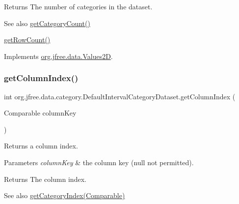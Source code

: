 \begin{DoxyReturn}{Returns}
The number of categories in the dataset.
\end{DoxyReturn}
\begin{DoxySeeAlso}{See also}
\mbox{\hyperlink{classorg_1_1jfree_1_1data_1_1category_1_1_default_interval_category_dataset_af1e71ac84aa326b3b7ef89c398e5c0fb}{get\+Category\+Count()}} 

\mbox{\hyperlink{classorg_1_1jfree_1_1data_1_1category_1_1_default_interval_category_dataset_af827538c915c040aac83c23bc980b0f5}{get\+Row\+Count()}} 
\end{DoxySeeAlso}


Implements \mbox{\hyperlink{interfaceorg_1_1jfree_1_1data_1_1_values2_d_a212e32802dc2f32e0fb641740137c685}{org.\+jfree.\+data.\+Values2D}}.

\mbox{\label{classorg_1_1jfree_1_1data_1_1category_1_1_default_interval_category_dataset_aa081b358d8813325db79019dafaa2c62}} 
\subsubsection{\texorpdfstring{get\+Column\+Index()}{getColumnIndex()}}
{\footnotesize\ttfamily int org.\+jfree.\+data.\+category.\+Default\+Interval\+Category\+Dataset.\+get\+Column\+Index (\begin{DoxyParamCaption}\item[{Comparable}]{column\+Key }\end{DoxyParamCaption})}

Returns a column index.


\begin{DoxyParams}{Parameters}
{\em column\+Key} & the column key ({\ttfamily null} not permitted).\\
\hline
\end{DoxyParams}
\begin{DoxyReturn}{Returns}
The column index.
\end{DoxyReturn}
\begin{DoxySeeAlso}{See also}
\mbox{\hyperlink{classorg_1_1jfree_1_1data_1_1category_1_1_default_interval_category_dataset_a3cc570f2c983a658ddf8aae36a84e57d}{get\+Category\+Index(\+Comparable)}} 
\end{DoxySeeAlso}


